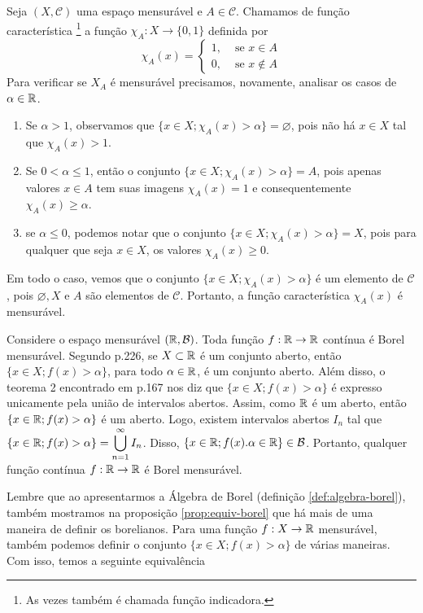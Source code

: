 \begin{example}
    Seja $(X, \mathcal{C})$ uma espaço mensurável e $A \in \mathcal{C}$.
    Chamamos de função característica \footnote{As vezes também é chamada  função indicadora.}
    a função $\chi_A: X \to \{0,1\}$ definida por 
    $$\chi_A(x) =\left\{\begin{array}{cc}
         1, & \textrm{\ se \ } x \in A \\
         0, & \textrm{\ se \ } x \notin A
    \end{array}\right.
    $$
Para verificar se $X_A$ é mensurável precisamos, novamente, analisar os casos de $\alpha \in \mathbb{R}$.
\begin{enumerate}[label*= (\Roman*)]
\item Se $\alpha > 1$, observamos que $\{x \in X; \chi_A(x)>  \alpha\} = \varnothing$, pois não há $x \in X$ tal que $\chi_A(x) > 1$.  
\item Se $ 0 <\alpha \leq 1$, então o conjunto $\{x \in X; \chi_A(x)>  \alpha\} = A$, pois apenas valores $x \in A$ tem suas imagens $\chi_A(x) = 1$ e consequentemente $\chi_A(x) \geq \alpha$.
\item  se $\alpha \leq 0$, podemos notar que o conjunto $\{x \in X; \chi_A(x)>  \alpha\} = X$, pois para qualquer que seja $x \in X$, os valores $\chi_A(x) \geq 0$.

\end{enumerate}
Em todo o caso, vemos que o conjunto $\{x \in X; \chi_A(x)>  \alpha\}$ é um elemento de $\mathcal{C}$, pois $\varnothing, X$ e $A$ são elementos de $\mathcal{C}$. Portanto, a função característica $\chi_A(x)$ é mensurável.

\end{example}

\begin{example}
\label{ex:função-continua-mensuravel}
    Considere o espaço mensurável $(\mathbb{R}, \operatorname{\mathcal{B}})$. Toda função $f: \mathbb{R} \to \mathbb{R}$ contínua é Borel mensurável.
    Segundo \supercite{elon}{p.226}, se $X \subset \mathbb{R}$ é um conjunto aberto, então $\{x \in X; f(x) > \alpha\}$, para todo $\alpha \in \mathbb{R}$, é um conjunto aberto. Além disso, o teorema 2 encontrado em \supercite{elon}{p.167} nos diz que $\{x \in X; f(x) > \alpha\}$ é expresso unicamente pela união de intervalos abertos. 
    Assim, como $\mathbb{R}$ é um aberto, então $\{x \in \mathbb{R}; f(x) > \alpha\}$ é um aberto. Logo, existem intervalos abertos $I_n$ tal que $\{x \in \mathbb{R}; f(x) > \alpha\} = \displaystyle\bigcup_{n = 1}^\infty I_n$. Disso, $\{x \in \mathbb{R}; f(x) . \alpha \in \mathbb{R}\} \in \operatorname{\mathcal{B}}$.
    Portanto, qualquer função contínua $f: \mathbb{R} \to \mathbb{R}$ é Borel mensurável.
    \end{example}
    Lembre que ao apresentarmos a Álgebra de Borel (definição \ref{def:algebra-borel}), também mostramos na proposição \ref{prop:equiv-borel} que há mais de uma maneira de definir os borelianos.
    Para uma função $f: X \to \mathbb{R}$ mensurável, também podemos definir o conjunto $\{x \in X; f(x) > \alpha\}$ de várias maneiras.
    Com isso, temos a seguinte equivalência
    
